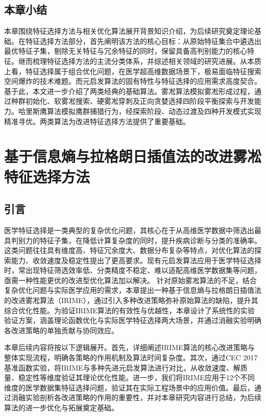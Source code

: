 \documentclass{wzuthesis}
\begin{document}
\newpage
\section{本章小结}
本章围绕特征选择方法与相关优化算法展开背景知识介绍，为后续研究奠定理论基础。在特征选择方法部分，首先阐明该方法的核心目标：从原始特征集合中遴选出最优特征子集，剔除无关特征与冗余特征的同时，保留具备高判别能力的核心特征。继而梳理特征选择方法的主流分类体系，并综述相关领域的研究进展。从本质上看，特征选择属于组合优化问题，在医学超高维数据场景下，极易面临特征搜索空间爆炸的技术难题。而元启发算法的固有特性与特征选择的应用需求高度契合。基于此，本文进一步介绍了两类经典的基础算法。雾凇算法模拟雾凇形成过程，通过种群初始化、软雾凇搜索、硬雾凇穿刺及正向贪婪选择四阶段平衡探索与开发能力。哈里斯鹰算法模拟鹰群捕猎行为，经探索阶段、动态过渡及四种开发模式实现精准寻优。两类算法为改进特征选择方法提供了重要基础。

\chapter{基于信息熵与拉格朗日插值法的改进雾凇特征选择方法}

\section{引言}
医学特征选择是一类典型的复杂优化问题，其核心在于从高维医学数据中筛选出最具判别力的特征子集，在降低计算复杂度的同时，提升疾病诊断与分类的准确率。这类问题往往具有维度高、特征冗余度大、数据分布复杂等特点，对优化算法的探索能力、收敛速度及稳定性提出了更高要求。现有元启发算法应用于医学特征选择时，常出现特征筛选效率低、分类精度不稳定、难以适配高维医学数据集等问题，亟需一种性能更优的改进型优化算法加以解决。
针对原始雾凇算法的不足，结合复杂优化问题与实际医学应用的需求，本章提出一种基于信息熵与拉格朗日插值法的改进雾凇算法（IRIME），通过引入多种改进策略弥补原始算法的缺陷，提升其综合优化性能。为验证IRIME算法的有效性与优越性，本章设计了系统性的实验验证方案，涵盖理论函数优化与实际医学特征选择两大场景，并通过消融实验明确各改进策略的单独贡献与协同效应。

本章后续内容将按以下逻辑展开。首先，详细阐述IRIME算法的核心改进策略与整体实现流程，明确各策略的作用机制及算法时间复杂度。其次，通过CEC 2017基准函数实验，将IRIME与多种先进元启发算法进行对比，从收敛速度、解质量、稳定性等维度验证其理论优化性能。进一步，我们将IRIME应用于12个不同维度的医学数据集特征选择问题，验证其在实际工程场景中的应用价值。最后，通过消融实验剖析各改进策略的作用的重要性，并对本章研究内容进行总结，为后续算法的进一步优化与拓展奠定基础。
\end{document}

